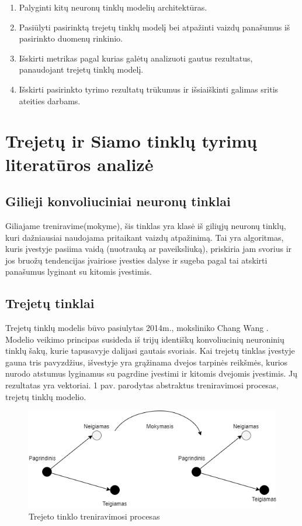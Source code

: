 \documentclass{VUMIFPSkursinis}
\DeclareRobustCommand{\[}{\begin{equation}}
\DeclareRobustCommand{\]}{\end{equation}}
\begin{document}
\pagebreak
 
\thispagestyle{empty}
\begin{enumerate}
\item{Palyginti kitų neuronų tinklų modelių architektūras.}
\item{Pasiūlyti pasirinktą trejetų tinklų modelį bei atpažinti vaizdų panašumus iš pasirinkto duomenų rinkinio.}
\item{ Išskirti metrikas pagal kurias galėtų analizuoti gautus rezultatus, panaudojant trejetų tinklų modelį.}
\item{Išskirti pasirinkto tyrimo rezultatų trūkumus ir išsiaiškinti galimas sritis ateities darbams.}
\end{enumerate}

\pagebreak
\section{Trejetų ir Siamo tinklų tyrimų literatūros analizė}

\subsection{Gilieji konvoliuciniai neuronų tinklai}
Giliajame treniravime(mokyme), šis tinklas yra klasė iš giliųjų neuronų tinklų, kuri dažniausiai naudojama pritaikant vaizdų atpažinimą. Tai yra algoritmas, kuris įvestyje pasiima vaidą (nuotrauką ar paveiksliuką), priskiria jam svorius ir jos bruožų tendencijas įvairiose įvesties dalyse ir sugeba pagal tai atskirti panašumus lyginant su kitomis įvestimis.

\subsection{Trejetų tinklai}
Trejetų tinklų modelis būvo pasiulytas 2014m., moksliniko Chang Wang \cite{Learning_fine_grained_image}. Modelio veikimo principas susideda iš trijų identiškų konvoliucinių neuroninių tinklų šakų, kurie tapusavyje dalijasi gautais svoriais. Kai trejetų tinklas įvestyje gauna tris pavyzdžius, išvestyje yra grąžinama dvejos tarpinės reikšmės, kurios nurodo atstumus lyginamus su pagrdine įvestimi ir kitomis dvejomis įvestimis. Jų rezultatas yra vektoriai. 1 pav. parodytas abstraktus treniravimosi procesas, trejetų tinklų modelio.
\begin{figure}[H]
\centering
\includegraphics[scale=0.5]{img/Triplet_network}
\caption{Trejeto tinklo treniravimosi procesas \cite{Improved_triplet_network}} %
\label{img:mlp}
\end{figure}
\pagebreak
\end{document}
